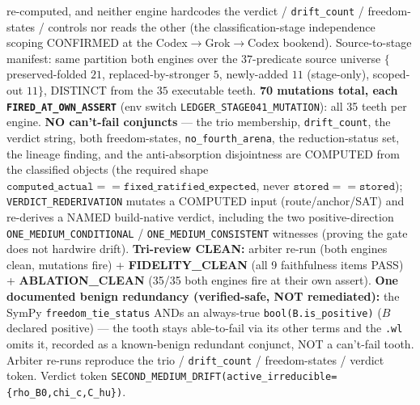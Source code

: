 re-computed, and neither engine hardcodes the verdict / \texttt{drift\_count} /
freedom-states / controls nor reads the other (the classification-stage
independence scoping CONFIRMED at the Codex\(\to\)Grok\(\to\)Codex bookend).
Source-to-stage manifest: same partition both engines over the \(37\)-predicate
source universe \(\{\)preserved-folded \(21\), replaced-by-stronger \(5\),
newly-added \(11\) (stage-only), scoped-out \(11\)\(\}\), DISTINCT from the \(35\)
executable teeth. \textbf{70 mutations total, each \texttt{FIRED\_AT\_OWN\_ASSERT}}
(env switch \texttt{LEDGER\_STAGE041\_MUTATION}): all 35 teeth per engine.
\textbf{NO can't-fail conjuncts} --- the trio membership, \texttt{drift\_count},
the verdict string, both freedom-states, \texttt{no\_fourth\_arena}, the
reduction-status set, the lineage finding, and the anti-absorption disjointness
are COMPUTED from the classified objects (the required shape
\(\texttt{computed\_actual}==\texttt{fixed\_ratified\_expected}\), never
\(\texttt{stored}==\texttt{stored}\)); \texttt{VERDICT\_REDERIVATION} mutates a
COMPUTED input (route/anchor/SAT) and re-derives a NAMED build-native verdict,
including the two positive-direction \texttt{ONE\_MEDIUM\_CONDITIONAL} /
\texttt{ONE\_MEDIUM\_CONSISTENT} witnesses (proving the gate does not hardwire
drift). \textbf{Tri-review CLEAN:} arbiter re-run (both engines clean, mutations
fire) + \textbf{FIDELITY\_CLEAN} (all 9 faithfulness items PASS) +
\textbf{ABLATION\_CLEAN} (35/35 both engines fire at their own assert). \textbf{One
documented benign redundancy (verified-safe, NOT remediated):} the SymPy
\texttt{freedom\_tie\_status} ANDs an always-true \texttt{bool(B.is\_positive)}
(\(B\) declared positive) --- the tooth stays able-to-fail via its other terms and
the \texttt{.wl} omits it, recorded as a known-benign redundant conjunct, NOT a
can't-fail tooth. Arbiter re-runs reproduce the trio / \texttt{drift\_count} /
freedom-states / verdict token. Verdict token
\texttt{SECOND\_MEDIUM\_DRIFT(active\_irreducible=\{rho\_B0,chi\_c,C\_hu\})}.

